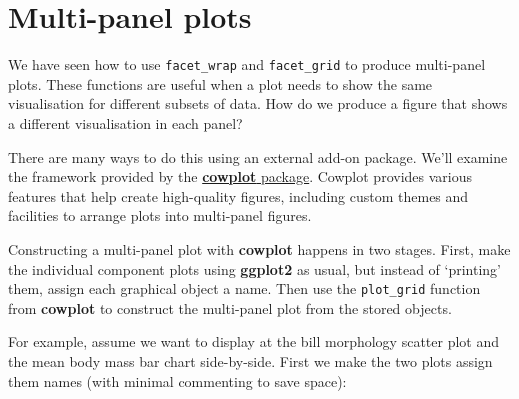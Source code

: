 \documentclass[
]{book}
\begin{document}
\hypertarget{multi-panel-plots}{%
\section{Multi-panel plots}\label{multi-panel-plots}}

We have seen how to use \texttt{facet\_wrap} and \texttt{facet\_grid} to produce multi-panel plots. These functions are useful when a plot needs to show the same visualisation for different subsets of data. How do we produce a figure that shows a different visualisation in each panel?

There are many ways to do this using an external add-on package. We'll examine the framework provided by the \href{https://wilkelab.org/cowplot/articles/index.html}{\textbf{cowplot} package}. Cowplot provides various features that help create high-quality figures, including custom themes and facilities to arrange plots into multi-panel figures.

Constructing a multi-panel plot with \textbf{cowplot} happens in two stages. First, make the individual component plots using \textbf{ggplot2} as usual, but instead of `printing' them, assign each graphical object a name. Then use the \texttt{plot\_grid} function from \textbf{cowplot} to construct the multi-panel plot from the stored objects.

For example, assume we want to display at the bill morphology scatter plot and the mean body mass bar chart side-by-side. First we make the two plots assign them names (with minimal commenting to save space):
\end{document}
